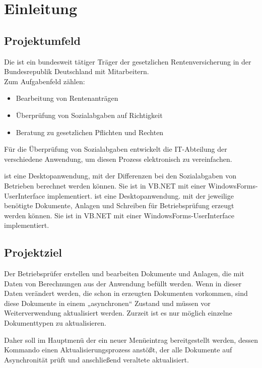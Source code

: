 \section{Einleitung}
\label{sec:Einleitung}


\subsection{Projektumfeld} 
\label{sec:Projektumfeld}

Die \DRV ist ein bundesweit tätiger Träger der gesetzlichen Rentenversicherung in der Bundesrepublik Deutschland
mit  Mitarbeitern.\\
Zum Aufgabenfeld zählen:
\begin{itemize}
	\item Bearbeitung von Rentenanträgen
	\item Überprüfung von Sozialabgaben auf Richtigkeit
	\item Beratung zu gesetzlichen Pflichten und Rechten
\end{itemize}

Für die Überprüfung von Sozialabgaben entwickelt die IT-Abteilung der \DRV verschiedene Anwendung, um diesen Prozess elektronisch zu vereinfachen.

\CBPNB ist eine Desktopanwendung, mit der Differenzen bei den Sozialabgaben von Betrieben berechnet werden können. Sie ist in VB.NET mit einer WindowsForms-UserInterface implementiert.
\CBPAD ist eine Desktopanwendung. mit der jeweilige benötigte Dokumente, Anlagen und Schreiben für Betriebsprüfung erzeugt werden können. Sie ist in VB.NET mit einer WindowsForms-UserInterface implementiert.

\subsection{Projektziel} 
\label{sec:Projektziel}

Der Betriebsprüfer erstellen und bearbeiten Dokumente und Anlagen, die mit Daten von Berechnungen aus der Anwendung \CBPNB befüllt werden. Wenn in dieser Daten verändert werden, die schon in erzeugten Dokumenten vorkommen, sind diese Dokumente in einem „asynchronen“ Zustand und müssen vor Weiterverwendung aktualisiert werden. Zurzeit ist es nur möglich einzelne Dokumenttypen zu aktualisieren.

Daher soll im Hauptmenü der \CBPAD ein neuer Menüeintrag bereitgestellt werden, dessen Kommando einen Aktualisierungsprozess anstößt, der alle Dokumente auf Asynchronität prüft und anschließend veraltete aktualisiert.

